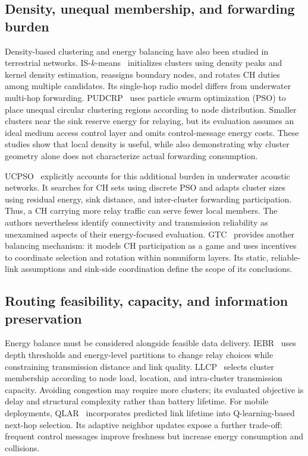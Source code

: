 \subsection{Density, unequal membership, and forwarding burden}

Density-based clustering and energy balancing have also been studied in
terrestrial networks. IS-$k$-means~\cite{Zhu2021SoftKMeans} initializes
clusters using density peaks and kernel density estimation, reassigns
boundary nodes, and rotates CH duties among multiple candidates. Its
single-hop radio model differs from underwater multi-hop forwarding.
PUDCRP~\cite{Ruan2019PUDCRP} uses particle swarm optimization (PSO) to
place unequal circular clustering regions according to node distribution.
Smaller clusters near the sink reserve energy for relaying, but its evaluation
assumes an ideal medium access control layer and omits control-message
energy costs. These studies show that local density is useful, while also
demonstrating why cluster geometry alone does not characterize actual
forwarding consumption.

UCPSO~\cite{Hou2022UCPSO} explicitly accounts for this additional burden in
underwater acoustic networks. It searches for CH sets using discrete PSO and
adapts cluster sizes using residual energy, sink distance, and inter-cluster
forwarding participation. Thus, a CH carrying more relay traffic can serve
fewer local members. The authors nevertheless identify connectivity and
transmission reliability as unexamined aspects of their energy-focused
evaluation. GTC~\cite{Xing2021GTC} provides another balancing mechanism:
it models CH participation as a game and uses incentives to coordinate
selection and rotation within nonuniform layers. Its static, reliable-link
assumptions and sink-side coordination define the scope of its conclusions.

\subsection{Routing feasibility, capacity, and information preservation}

Energy balance must be considered alongside feasible data delivery.
IEBR~\cite{Feng2019IEBR} uses depth thresholds and energy-level partitions
to change relay choices while constraining transmission distance and link
quality. LLCP~\cite{Mei2024LLCP} selects cluster membership according to
node load, location, and intra-cluster transmission capacity. Avoiding
congestion may require more clusters; its evaluated objective is delay and
structural complexity rather than battery lifetime.
For mobile deployments, QLAR~\cite{Li2025QLAR} incorporates predicted
link lifetime into Q-learning-based next-hop selection. Its adaptive neighbor
updates expose a further trade-off: frequent control messages improve
freshness but increase energy consumption and collisions.

